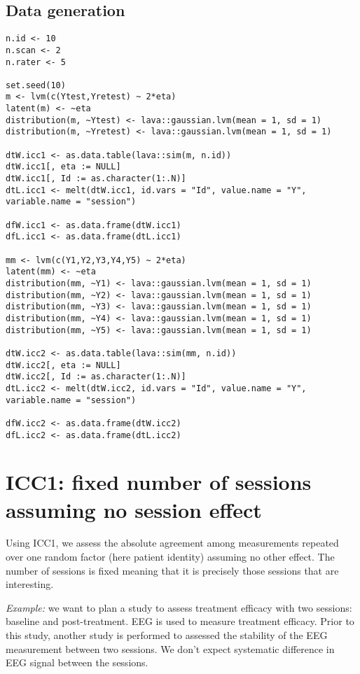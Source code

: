 \documentclass[12pt]{article}
\begin{document}
\subsection{Data generation}
\label{sec:org1494f2b}
\lstset{language=r,label= ,caption= ,captionpos=b,numbers=none}
\begin{lstlisting}
n.id <- 10
n.scan <- 2
n.rater <- 5

set.seed(10)
m <- lvm(c(Ytest,Yretest) ~ 2*eta)
latent(m) <- ~eta
distribution(m, ~Ytest) <- lava::gaussian.lvm(mean = 1, sd = 1)
distribution(m, ~Yretest) <- lava::gaussian.lvm(mean = 1, sd = 1)

dtW.icc1 <- as.data.table(lava::sim(m, n.id))
dtW.icc1[, eta := NULL]
dtW.icc1[, Id := as.character(1:.N)]
dtL.icc1 <- melt(dtW.icc1, id.vars = "Id", value.name = "Y", variable.name = "session")

dfW.icc1 <- as.data.frame(dtW.icc1)
dfL.icc1 <- as.data.frame(dtL.icc1)

mm <- lvm(c(Y1,Y2,Y3,Y4,Y5) ~ 2*eta)
latent(mm) <- ~eta
distribution(mm, ~Y1) <- lava::gaussian.lvm(mean = 1, sd = 1)
distribution(mm, ~Y2) <- lava::gaussian.lvm(mean = 1, sd = 1)
distribution(mm, ~Y3) <- lava::gaussian.lvm(mean = 1, sd = 1)
distribution(mm, ~Y4) <- lava::gaussian.lvm(mean = 1, sd = 1)
distribution(mm, ~Y5) <- lava::gaussian.lvm(mean = 1, sd = 1)

dtW.icc2 <- as.data.table(lava::sim(mm, n.id))
dtW.icc2[, eta := NULL]
dtW.icc2[, Id := as.character(1:.N)]
dtL.icc2 <- melt(dtW.icc2, id.vars = "Id", value.name = "Y", variable.name = "session")

dfW.icc2 <- as.data.frame(dtW.icc2)
dfL.icc2 <- as.data.frame(dtL.icc2)
\end{lstlisting}


\clearpage

\section{ICC1: fixed number of sessions assuming no session effect}
\label{sec:orgf598e5e}

Using ICC1, we assess the absolute agreement among measurements
repeated over one random factor (here patient identity) assuming no
other effect. The number of sessions is fixed meaning that it is
precisely those sessions that are interesting. 

\bigskip

\emph{Example:} we want to plan a study to assess treatment efficacy with
two sessions: baseline and post-treatment. EEG is used to measure
treatment efficacy. Prior to this study, another study is performed to
assessed the stability of the EEG measurement between two sessions. We
don't expect systematic difference in EEG signal between the sessions.
\end{document}
